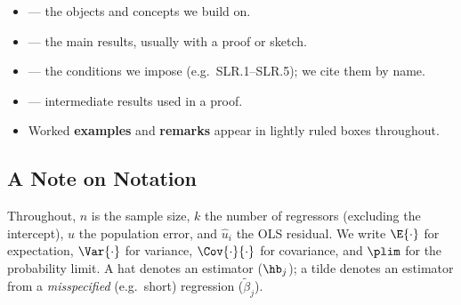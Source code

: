 \documentclass[oneside]{book}
\begin{document}
\begin{itemize}
    \item {} --- the objects and concepts we build on.
    \item {} --- the main results, usually with a proof or sketch.
    \item {} --- the conditions we impose (e.g.\ SLR.1--SLR.5); we cite them by name.
    \item {} --- intermediate results used in a proof.
    \item Worked \textbf{examples} and \textbf{remarks} appear in lightly ruled boxes throughout.
\end{itemize}

\subsection*{A Note on Notation}

Throughout, $n$ is the sample size, $k$ the number of regressors (excluding the intercept), $u$ the population error, and $\widehat{u}_i$ the OLS residual. We write $\E{\cdot}$ for expectation, $\Var{\cdot}$ for variance, $\Cov{\cdot}{\cdot}$ for covariance, and $\plim$ for the probability limit. A hat denotes an estimator ($\hb_j$); a tilde denotes an estimator from a \emph{misspecified} (e.g.\ short) regression ($\widetilde{\beta}_j$).

\newpage

\setcounter{tocdepth}{1}
\tableofcontents
\newpage











\end{document}
